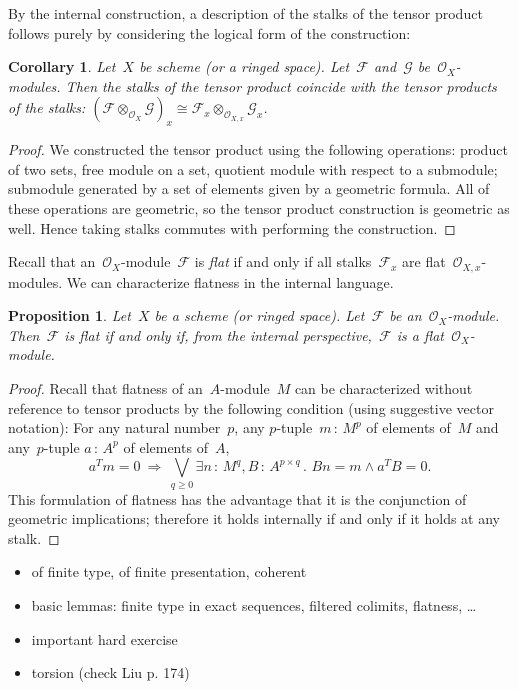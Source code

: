 \documentclass[10pt]{amsart}
\theoremstyle{definition}
\theoremstyle{plain}
\newtheorem{prop}[defn]{Proposition}
\newtheorem{cor}[defn]{Corollary}
\theoremstyle{remark}
\newcommand{\F}{\mathcal{F}}
\newcommand{\G}{\mathcal{G}}
\renewcommand{\O}{\mathcal{O}}
\newcommand{\?}{\,{:}\,}
\renewcommand{\_}{\mathpunct{.}\,}
\begin{document}
By the internal construction, a description of the stalks of the tensor product
follows purely by considering the logical form of the construction:
\begin{cor}Let~$X$ be scheme (or a ringed space). Let~$\F$ and~$\G$
be~$\O_X$-modules. Then the stalks of the tensor product coincide with the
tensor products of the stalks: $(\F \otimes_{\O_X} \G)_x \cong \F_x
\otimes_{\O_{X,x}} \G_x$.\end{cor}
\begin{proof}
We constructed the tensor product using the following operations: product of
two sets, free module on a set, quotient module with respect to a submodule;
submodule generated by a set of elements given by a geometric formula.
All of these operations are geometric, so the tensor product construction is
geometric as well. Hence taking stalks commutes with performing the
construction.
\end{proof}

Recall that an~$\O_X$-module~$\F$ is \emph{flat} if and only if all
stalks~$\F_x$ are flat~$\O_{X,x}$-modules. We can characterize flatness in the
internal language.
\begin{prop}Let~$X$ be a scheme (or ringed space). Let~$\F$ be
an~$\O_X$-module. Then~$\F$ is flat if and only if, from the internal
perspective,~$\F$ is a flat~$\O_X$-module.
\end{prop}
\begin{proof}
Recall that flatness of an~$A$-module~$M$ can be characterized without
reference to tensor products by the following condition (using
suggestive vector notation): For any natural number~$p$,
any $p$-tuple~$m \? M^p$ of elements of~$M$ and
any~$p$-tuple $a \? A^p$ of elements of~$A$,
\[
  a^T m = 0 \ \Longrightarrow\ 
  \bigvee\limits_{q \geq 0} \exists n\?M^q, B\?A^{p \times q}\_
  Bn = m \wedge a^T B = 0. \]
This formulation of flatness has the advantage that it is the conjunction of
geometric implications; therefore it holds internally if and only if it holds at
any stalk.
\end{proof}

\begin{itemize}
\item of finite type, of finite presentation, coherent
\item basic lemmas: finite type in exact sequences, filtered colimits,
flatness, \ldots
\item important hard exercise
\item torsion (check Liu p. 174)
\end{itemize}
\end{document}
